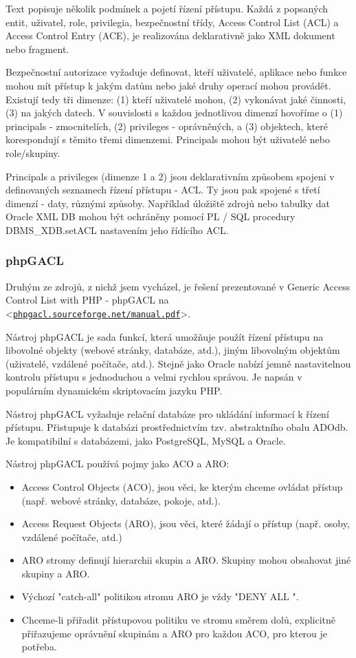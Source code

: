 \documentclass[11pt,twoside,a4paper]{book}
\let\oldUrl\url
\renewcommand\url[1]{<\texttt{\oldUrl{#1}}>}
\begin{document}
Text popisuje několik podmínek a pojetí řízení přístupu. Každá z popsaných entit, uživatel, role, privilegia, bezpečnostní třídy, Access Control List (ACL) a Access Control Entry (ACE), je realizována deklarativně jako XML dokument nebo fragment.  

Bezpečnostní autorizace vyžaduje definovat, kteří uživatelé, aplikace nebo funkce mohou mít přístup k jakým datům nebo jaké druhy operací mohou provádět. Existují tedy tři dimenze: (1) kteří uživatelé mohou, (2) vykonávat jaké činnosti, (3) na jakých datech. V souvislosti s každou jednotlivou dimenzí hovoříme o (1) principals - zmocnitelích, (2) privileges - oprávněných, a (3) objektech, které korespondují s těmito třemi dimenzemi. Principals mohou být uživatelé nebo role/skupiny.

Principals a privileges (dimenze 1 a 2) jsou deklarativním způsobem spojeni v definovaných seznamech řízení přístupu - ACL. Ty jsou pak spojené s třetí dimenzí - daty, různými způsoby. Například úložiště zdrojů nebo tabulky dat Oracle XML DB mohou být ochráněny pomocí PL / SQL procedury DBMS\_XDB.setACL nastavením jeho řídícího ACL.


\subsubsection{phpGACL}
Druhým ze zdrojů, z nichž jsem vycházel, je řešení prezentované v Generic Access Control List with PHP - phpGACL na  \url{phpgacl.sourceforge.net/manual.pdf}.

Nástroj phpGACL je sada funkcí, která umožňuje použít řízení přístupu na libovolné objekty (webové stránky, databáze, atd.), jiným libovolným objektům (uživatelé, vzdálené počítače, atd.). 
Stejně jako Oracle nabízí jemně nastavitelnou kontrolu přístupu s jednoduchou a velmi rychlou správou. Je napsán v populárním dynamickém skriptovacím jazyku PHP.

Nástroj phpGACL vyžaduje relační databáze pro ukládání informací k řízení přístupu. Přistupuje k databázi prostřednictvím tzv. abstraktního obalu ADOdb. Je kompatibilní s databázemi, jako PostgreSQL, MySQL a Oracle. 

Nástroj phpGACL používá pojmy jako ACO a ARO:
\begin{itemize}
\item Access Control Objects (ACO), jsou věci, ke kterým chceme ovládat přístup (např. webové stránky, databáze, pokoje, atd.).
\item Access Request Objects (ARO), jsou věci, které žádají o přístup (např. osoby, vzdálené počítače, atd.)
\item ARO stromy definují hierarchii skupin a ARO. Skupiny mohou obsahovat jiné skupiny a ARO.
\item Výchozí "catch-all" politikou stromu ARO je vždy "DENY ALL ".
\item Chceme-li přiřadit přístupovou politiku ve stromu směrem dolů, explicitně přiřazujeme oprávnění skupinám a ARO pro každou ACO, pro kterou je potřeba.
\end{itemize}
\end{document}
